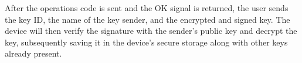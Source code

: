 After the operations code is sent and the OK signal is returned, the user sends the key ID, the name of the key sender, and the encrypted and signed key.
The device will then verify the signature with the sender's public key and decrypt the key, subsequently saving it in the device's secure storage along with other keys already present.
